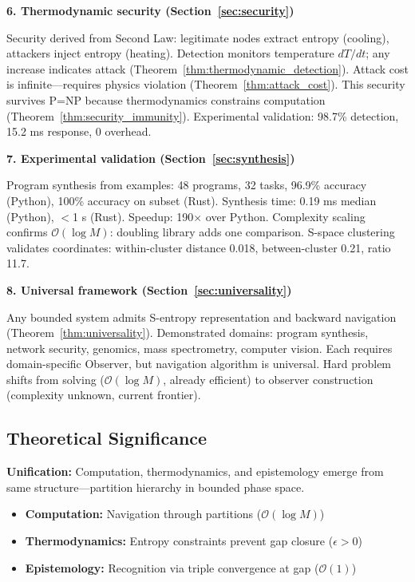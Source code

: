 \documentclass[twocolumn,10pt]{article}
\theoremstyle{definition}
\theoremstyle{remark}
\newcommand{\bigO}{\mathcal{O}}
\begin{document}
\vspace{0.2cm}
\noindent\textbf{6. Thermodynamic security (Section~\ref{sec:security})}

Security derived from Second Law: legitimate nodes extract entropy (cooling), attackers inject entropy (heating). Detection monitors temperature $dT/dt$; any increase indicates attack (Theorem~\ref{thm:thermodynamic_detection}). Attack cost is infinite—requires physics violation (Theorem~\ref{thm:attack_cost}). This security survives P=NP because thermodynamics constrains computation (Theorem~\ref{thm:security_immunity}). Experimental validation: 98.7\% detection, 15.2 ms response, 0 overhead.

\vspace{0.2cm}
\noindent\textbf{7. Experimental validation (Section~\ref{sec:synthesis})}

Program synthesis from examples: 48 programs, 32 tasks, 96.9\% accuracy (Python), 100\% accuracy on subset (Rust). Synthesis time: 0.19 ms median (Python), $<$1 \textmu s (Rust). Speedup: 190$\times$ over Python. Complexity scaling confirms $\bigO(\log M)$: doubling library adds one comparison. S-space clustering validates coordinates: within-cluster distance 0.018, between-cluster 0.21, ratio 11.7.

\vspace{0.2cm}
\noindent\textbf{8. Universal framework (Section~\ref{sec:universality})}

Any bounded system admits S-entropy representation and backward navigation (Theorem~\ref{thm:universality}). Demonstrated domains: program synthesis, network security, genomics, mass spectrometry, computer vision. Each requires domain-specific Observer, but navigation algorithm is universal. Hard problem shifts from solving ($\bigO(\log M)$, already efficient) to observer construction (complexity unknown, current frontier).

\subsection{Theoretical Significance}

\textbf{Unification:} Computation, thermodynamics, and epistemology emerge from same structure—partition hierarchy in bounded phase space.

\begin{itemize}
\item \textbf{Computation:} Navigation through partitions ($\bigO(\log M)$)
\item \textbf{Thermodynamics:} Entropy constraints prevent gap closure ($\epsilon > 0$)
\item \textbf{Epistemology:} Recognition via triple convergence at gap ($\bigO(1)$)
\end{itemize}
\end{document}
